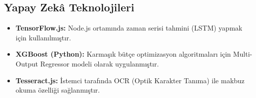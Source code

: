\subsection{Yapay Zekâ Teknolojileri}
\begin{itemize}
    \item \textbf{TensorFlow.js:} Node.js ortamında zaman serisi tahmini (LSTM) yapmak için kullanılmıştır.
    \item \textbf{XGBoost (Python):} Karmaşık bütçe optimizasyon algoritmaları için Multi-Output Regressor modeli olarak uygulanmıştır.
    \item \textbf{Tesseract.js:} İstemci tarafında OCR (Optik Karakter Tanıma) ile makbuz okuma özelliği sağlanmıştır.
\end{itemize}
